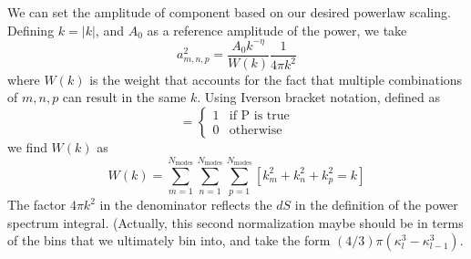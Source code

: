 \documentclass[11pt]{article}
\begin{document}
We can set the amplitude of component based on our desired
powerlaw scaling.  Defining $k = |k|$, and $A_0$ as a
reference amplitude of the power, we take
\begin{equation}
a_{m,n,p}^2 = \frac{A_0 k^{-\eta}}{W(k)} \frac{1}{4\pi k^2}
\end{equation}
where $W(k)$ is the weight that accounts for the fact that multiple
combinations of $m, n, p$ can result in the same $k$.  Using Iverson bracket
notation, defined as
\begin{equation}
[P] = \begin{cases}
  1 & \text{if P is true} \\
  0 & \text{otherwise}
      \end{cases}
\end{equation}
we find $W(k)$ as
\begin{equation}
W(k) = \sum_{m=1}^{N_\mathrm{modes}}
       \sum_{n=1}^{N_\mathrm{modes}} 
       \sum_{p=1}^{N_\mathrm{modes}} [ k_m^2 + k_n^2 + k_p^2 = k ]
\end{equation}
The factor $4\pi k^2$ in the denominator reflects the $dS$ in the 
definition of the power spectrum integral.  (Actually, this second
normalization maybe should be in terms of the bins that we ultimately
bin into, and take the form $(4/3)\pi (\kappa_l^3 - \kappa_{l-1}^3)$.
\end{document}

